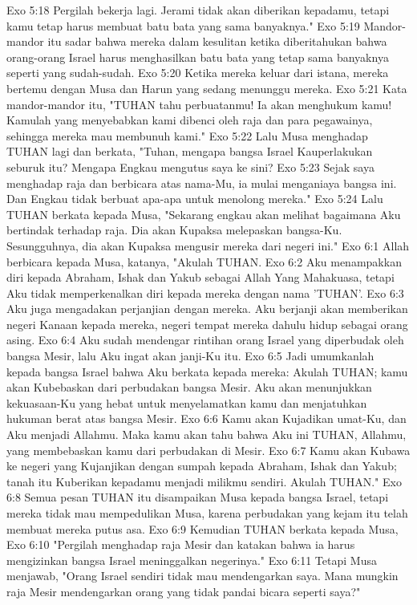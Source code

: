 Exo 5:18  Pergilah bekerja lagi. Jerami tidak akan diberikan kepadamu, tetapi kamu tetap harus membuat batu bata yang sama banyaknya."
Exo 5:19  Mandor-mandor itu sadar bahwa mereka dalam kesulitan ketika diberitahukan bahwa orang-orang Israel harus menghasilkan batu bata yang tetap sama banyaknya seperti yang sudah-sudah.
Exo 5:20  Ketika mereka keluar dari istana, mereka bertemu dengan Musa dan Harun yang sedang menunggu mereka.
Exo 5:21  Kata mandor-mandor itu, "TUHAN tahu perbuatanmu! Ia akan menghukum kamu! Kamulah yang menyebabkan kami dibenci oleh raja dan para pegawainya, sehingga mereka mau membunuh kami."
Exo 5:22  Lalu Musa menghadap TUHAN lagi dan berkata, "Tuhan, mengapa bangsa Israel Kauperlakukan seburuk itu? Mengapa Engkau mengutus saya ke sini?
Exo 5:23  Sejak saya menghadap raja dan berbicara atas nama-Mu, ia mulai menganiaya bangsa ini. Dan Engkau tidak berbuat apa-apa untuk menolong mereka."
Exo 5:24  Lalu TUHAN berkata kepada Musa, "Sekarang engkau akan melihat bagaimana Aku bertindak terhadap raja. Dia akan Kupaksa melepaskan bangsa-Ku. Sesungguhnya, dia akan Kupaksa mengusir mereka dari negeri ini."
Exo 6:1  Allah berbicara kepada Musa, katanya, "Akulah TUHAN.
Exo 6:2  Aku menampakkan diri kepada Abraham, Ishak dan Yakub sebagai Allah Yang Mahakuasa, tetapi Aku tidak memperkenalkan diri kepada mereka dengan nama 'TUHAN'.
Exo 6:3  Aku juga mengadakan perjanjian dengan mereka. Aku berjanji akan memberikan negeri Kanaan kepada mereka, negeri tempat mereka dahulu hidup sebagai orang asing.
Exo 6:4  Aku sudah mendengar rintihan orang Israel yang diperbudak oleh bangsa Mesir, lalu Aku ingat akan janji-Ku itu.
Exo 6:5  Jadi umumkanlah kepada bangsa Israel bahwa Aku berkata kepada mereka: Akulah TUHAN; kamu akan Kubebaskan dari perbudakan bangsa Mesir. Aku akan menunjukkan kekuasaan-Ku yang hebat untuk menyelamatkan kamu dan menjatuhkan hukuman berat atas bangsa Mesir.
Exo 6:6  Kamu akan Kujadikan umat-Ku, dan Aku menjadi Allahmu. Maka kamu akan tahu bahwa Aku ini TUHAN, Allahmu, yang membebaskan kamu dari perbudakan di Mesir.
Exo 6:7  Kamu akan Kubawa ke negeri yang Kujanjikan dengan sumpah kepada Abraham, Ishak dan Yakub; tanah itu Kuberikan kepadamu menjadi milikmu sendiri. Akulah TUHAN."
Exo 6:8  Semua pesan TUHAN itu disampaikan Musa kepada bangsa Israel, tetapi mereka tidak mau mempedulikan Musa, karena perbudakan yang kejam itu telah membuat mereka putus asa.
Exo 6:9  Kemudian TUHAN berkata kepada Musa,
Exo 6:10  "Pergilah menghadap raja Mesir dan katakan bahwa ia harus mengizinkan bangsa Israel meninggalkan negerinya."
Exo 6:11  Tetapi Musa menjawab, "Orang Israel sendiri tidak mau mendengarkan saya. Mana mungkin raja Mesir mendengarkan orang yang tidak pandai bicara seperti saya?"
